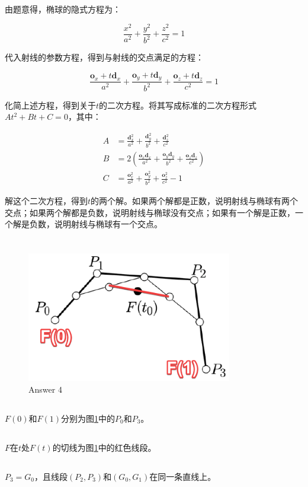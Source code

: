 \documentclass{article}
\begin{document}
由题意得，椭球的隐式方程为：

\[
    \frac{x^2}{a^2} + \frac{y^2}{b^2} + \frac{z^2}{c^2} = 1
\]

代入射线的参数方程，得到与射线的交点满足的方程：

\[
    \frac{\mathbf{o}_x+t\mathbf{d}_x}{a^2} + \frac{\mathbf{o}_y+t\mathbf{d}_y}{b^2} + \frac{\mathbf{o}_z+t\mathbf{d}_z}{c^2} = 1
\]

化简上述方程，得到关于$t$的二次方程。将其写成标准的二次方程形式$At^2+Bt+C=0$，其中：

\[
    \begin{aligned}
        A & = \frac{\mathbf{d}_x^2}{a^2} + \frac{\mathbf{d}_y^2}{b^2} + \frac{\mathbf{d}_z^2}{c^2}                                  \\
        B & = 2(\frac{\mathbf{o}_x\mathbf{d}_x}{a^2} + \frac{\mathbf{o}_y\mathbf{d}_y}{b^2} + \frac{\mathbf{o}_z\mathbf{d}_z}{c^2}) \\
        C & = \frac{\mathbf{o}_x^2}{a^2} + \frac{\mathbf{o}_y^2}{b^2} + \frac{\mathbf{o}_z^2}{c^2} - 1
    \end{aligned}
\]

解这个二次方程，得到$t$的两个解。如果两个解都是正数，说明射线与椭球有两个交点；如果两个解都是负数，说明射线与椭球没有交点；如果有一个解是正数，一个解是负数，说明射线与椭球有一个交点。

\section{}

\begin{figure}
    \centering
    \includegraphics[width=0.8\textwidth]{pic/Acrobat_jD6Pv6U3E4.png}
    \caption{Answer 4}
    \label{fig:answer4}
\end{figure}

\subsection{}

$F(0)$和$F(1)$分别为图\ref{fig:answer4}中的$P_0$和$P_3$。

\subsection{}

$F$在$t$处$F(t)$的切线为图\ref{fig:answer4}中的红色线段。

\subsection{}

$P_3=G_0$，且线段$(P_2, P_3)$和$(G_0, G_1)$在同一条直线上。
\end{document}
